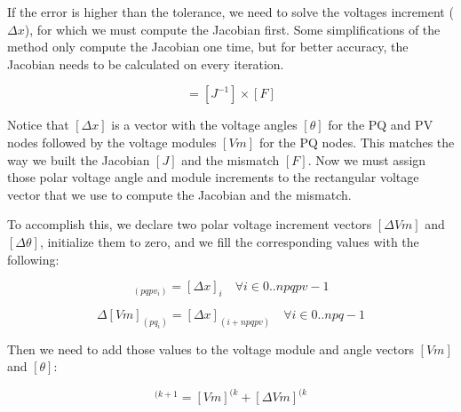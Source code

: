 \documentclass[nols,a4paper,twoside,notoc,fleqn]{tufte-book}
\begin{document}
If the error is higher than the tolerance, we need to solve the voltages increment ($\Delta x$), for which we must compute the Jacobian first. Some simplifications of the method only compute the Jacobian one time, but for better accuracy, the Jacobian needs to be calculated on every iteration.


\begin{equation}
[\Delta x] = [J^{-1}] \times [F]
\label{eq:nr_solve}
\end{equation}

Notice that $[\Delta x]$ is a vector with the voltage angles $[\theta]$ for the PQ and PV nodes followed by the voltage modules $[Vm]$ for the PQ nodes. This matches the way we built the Jacobian $[J]$ and the mismatch $[F]$. Now we must assign those polar voltage angle and module increments to the rectangular voltage vector that we use to compute the Jacobian and the mismatch.

To accomplish this, we declare two polar voltage increment vectors $[\Delta Vm]$ and $[\Delta \theta]$, initialize them to zero, and we fill the corresponding values with the following:


\begin{equation}
[\Delta \theta]_{(pqpv_i)} = [\Delta x]_i  \quad \forall i \in {0..npqpv-1}
\label{eq:nr_dd1}
\end{equation}

\begin{equation}
\Delta  [Vm]_{(pq_i)} = [\Delta x]_{(i+npqpv)}  \quad \forall i \in {0..npq-1}
\end{equation}

Then we need to add those values to the voltage module and angle vectors $[Vm]$ and $[\theta]$:

\begin{equation}
[Vm]^{(k+1} = [Vm]^{(k} + [\Delta Vm]^{(k}
\end{equation}

\end{document}

